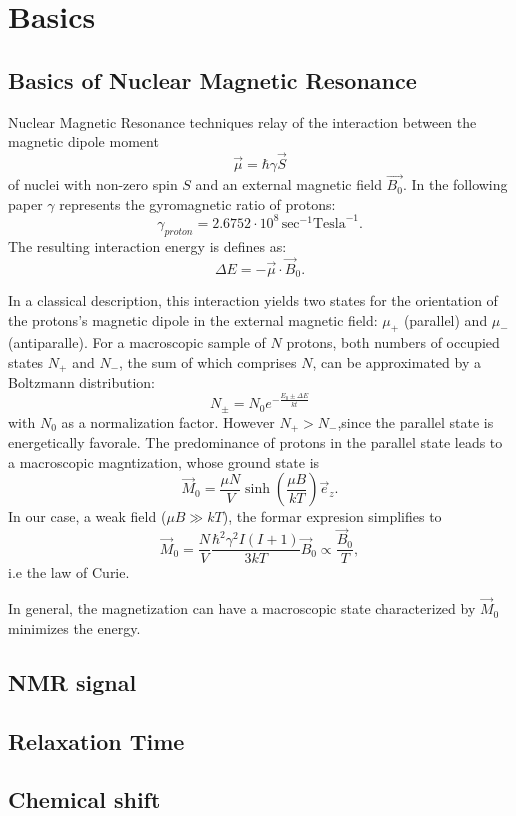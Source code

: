 \section{Basics}
\subsection{Basics of Nuclear Magnetic Resonance}

Nuclear Magnetic Resonance techniques relay of the interaction between the magnetic dipole moment
\begin{equation}
\vec{\mu} = \hbar\gamma\vec{S} 
\end{equation}
 of nuclei with non-zero spin $S$ and an external magnetic field $\vec{B_0}$. In the following paper $\gamma$ represents the gyromagnetic ratio of protons:
 \begin{equation}
 \gamma_{proton} = 2.6752 \cdot 10^8 \, \textrm{sec}^{-1}\textrm{Tesla}^{-1}.
 \end{equation}
The resulting interaction energy is defines as:
\begin{equation}
\Delta E = -\vec{\mu}\cdot\vec{B}_0.
\end{equation}

In a classical description, this interaction yields two states for the orientation of the protons's magnetic dipole in the external magnetic field: $\mu_+$ (parallel) and $\mu_-$ (antiparalle).
For a macroscopic sample of $N$ protons, both numbers of occupied states $N_+$ and $N_-$, the sum of which comprises $N$, can be approximated by a Boltzmann distribution:
\begin{equation}
 N_\pm = N_0e^{-\frac{E_0\pm\Delta E}{kt}}
\end{equation}
with $N_0$ as a normalization factor. However $N_+ > N_-$,since the parallel state is energetically favorale. The predominance of protons in the parallel state leads to a macroscopic magntization, whose ground state is
\begin{equation}
\vec{M}_0 = \frac{\mu N}{V}\sinh{\left(\frac{\mu B}{kT}\right)} \vec{e}_z .
\end{equation}
In our case, a weak field ($\mu B \gg kT$), the formar expresion simplifies to
\begin{equation}
\vec{M}_0 = \frac{N}{V} \frac{\hbar^2 \gamma^2 I(I+1)}{3kT}\vec{B}_0 \propto \frac{\vec{B}_0}{T},
\end{equation}
i.e the law of Curie.

In general, the magnetization can have a macroscopic state characterized by $\vec{M}_0$ minimizes the energy.

\subsection{NMR signal}
\subsection{Relaxation Time}
\subsection{Chemical shift}

